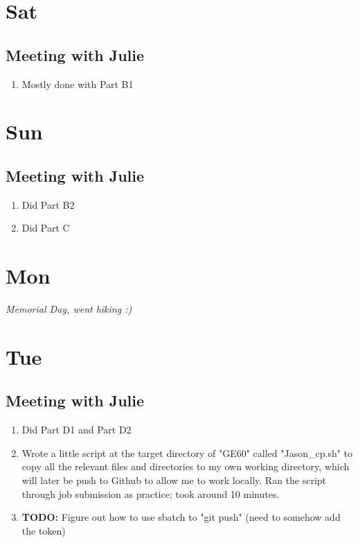 \documentclass[12pt,letterpaper]{article}
\begin{document}
\section{Sat}
\subsection{Meeting with Julie}
\begin{enumerate}
  \item Mostly done with Part B1
\end{enumerate}


\section{Sun}
\subsection{Meeting with Julie}
\begin{enumerate}
  \item Did Part B2
  \item Did Part C
\end{enumerate}

\section{Mon}
\textit{Memorial Day, went hiking :)}

\section{Tue}
\subsection{Meeting with Julie}
\begin{enumerate}
  \item Did Part D1 and Part D2
  \item Wrote a little script at the target directory of "GE60" called 
    "Jason_cp.sh" to copy all the relevant files and directories to my
    own working directory, which will later be push to Github to allow
    me to work locally. Ran the script through job submission as practice;
    took around 10 minutes.
  \item \textbf{TODO:} Figure out how to use sbatch to "git push" (need to somehow
    add the token)
\end{enumerate}
\end{document}

